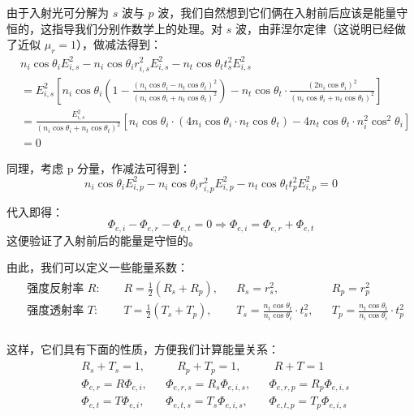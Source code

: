\documentclass[UTF8]{report}
\theoremstyle{MyLineTheoremStyle} %
\theoremstyle{MyBlockTheoremStyle} %
\theoremstyle{MySubsubsectionStyle} %
\begin{document}
由于入射光可分解为 $s$ 波与 $p$ 波，我们自然想到它们俩在入射前后应该是能量守恒的，这指导我们分别作数学上的处理。对 $s$ 波，由菲涅尔定律（这说明已经做了近似 $\mu_r = 1$），做减法得到：
\begin{align*}
&n_i \cos \theta_i E_{i,s}^2 - n_i \cos \theta_i r_{i,s}^2E_{i,s}^2 -   n_t \cos \theta_t t_s^2E_{i,s}^2 \\
&= E_{i,s}^2 \left[ n_i\cos \theta_i \left( 1 - \frac{(n_i\cos \theta_i - n_t \cos \theta_t)^2}{(n_i\cos \theta_i + n_t \cos \theta_t)^2} \right) - n_t \cos \theta_t \cdot \frac{(2n_i \cos \theta_i)^2}{(n_i\cos \theta_i + n_t \cos \theta_t)^2} \right] \\ 
& = \frac{E_{i,s}^2}{(n_i\cos \theta_i + n_t \cos \theta_t)^2} \left[ n_i \cos \theta_i \cdot (4 n_i\cos \theta_i \cdot n_t \cos \theta_t) - 4 n_t \cos \theta_t \cdot n_i^2 \cos^2 \theta_i\right] \\ 
& = 0
\end{align*}

同理，考虑 p 分量，作减法可得到：
\begin{equation}
n_i \cos \theta_i E_{i,p}^2 - n_i \cos \theta_i r_{i,p}^2E_{i,p}^2 -   n_t \cos \theta_t t_p^2E_{i,p}^2 = 0
\end{equation}

代入即得：
\begin{equation}
    \Phi_{e,i} - \Phi_{e,r} - \Phi_{e,t} = 0 \Longrightarrow  \Phi_{e,i} = \Phi_{e,r} + \Phi_{e,t}
\end{equation}
这便验证了入射前后的能量是守恒的。

由此，我们可以定义一些能量系数：
\begin{gather}
\begin{aligned}
    &\text{强度反射率 $R$: }\ &&R = \frac{1}{2}(R_s + R_p), &&R_s = r_s^2, && R_p = r_p^2 \\
    &\text{强度透射率 $T$: }\ &&T = \frac{1}{2}(T_s + T_p), &&T_s =\frac{n_t \cos \theta_t}{n_i \cos \theta_i} \cdot  t_s^2, && T_p =\frac{n_t \cos \theta_t}{n_i \cos \theta_i} \cdot  t_p^2 \\
\end{aligned}
\end{gather}

这样，它们具有下面的性质，方便我们计算能量关系：
\begin{gather}
\boxed{
\begin{aligned}
    &R_s + T_s = 1, &&\quad  R_p + T_p = 1,&&\ \  R + T = 1 \\ 
    &\Phi_{e,r} = R\Phi_{e,i}, && 
    \Phi_{e,r,s} = R_s\Phi_{e,i,s}, &&  \Phi_{e,r,p} = R_p\Phi_{e,i,s} 
    \\ 
    &\Phi_{e,t} = T\Phi_{e,i}, && \Phi_{e,t,s} = T_s\Phi_{e,i,s}, && \Phi_{e,t,p} = T_p\Phi_{e,i,s}
\end{aligned}
}
\end{gather}
\end{document}
